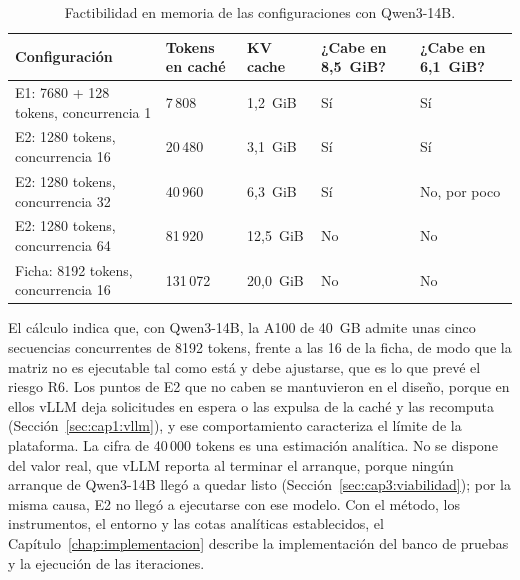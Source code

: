 \begin{table}[htbp]
  \centering
  \caption{Factibilidad en memoria de las configuraciones con Qwen3-14B.}
  \label{tab:cap2:factibilidad}
  \small
  \begin{tabular}{|p{}|p{}|p{}|p{}|p{}|}
    \hline
    \textbf{Configuración} & \textbf{Tokens en caché} & \textbf{KV cache} & \textbf{¿Cabe en 8,5~GiB?} & \textbf{¿Cabe en 6,1~GiB?} \\
    \hline
    E1: 7680 + 128 tokens, concurrencia 1 & 7\,808 & 1,2~GiB & Sí & Sí \\
    \hline
    E2: 1280 tokens, concurrencia 16 & 20\,480 & 3,1~GiB & Sí & Sí \\
    \hline
    E2: 1280 tokens, concurrencia 32 & 40\,960 & 6,3~GiB & Sí & No, por poco \\
    \hline
    E2: 1280 tokens, concurrencia 64 & 81\,920 & 12,5~GiB & No & No \\
    \hline
    Ficha: 8192 tokens, concurrencia 16 & 131\,072 & 20,0~GiB & No & No \\
    \hline
  \end{tabular}
\end{table}

El cálculo indica que, con Qwen3-14B, la A100 de 40~GB admite unas cinco secuencias concurrentes de 8192 tokens, frente a las 16 de la ficha, de modo que la matriz no es ejecutable tal como está y debe ajustarse, que es lo que prevé el riesgo R6. Los puntos de E2 que no caben se mantuvieron en el diseño, porque en ellos vLLM deja solicitudes en espera o las expulsa de la caché y las recomputa (Sección~\ref{sec:cap1:vllm}), y ese comportamiento caracteriza el límite de la plataforma. La cifra de 40\,000 tokens es una estimación analítica. No se dispone del valor real, que vLLM reporta al terminar el arranque, porque ningún arranque de Qwen3-14B llegó a quedar listo (Sección~\ref{sec:cap3:viabilidad}); por la misma causa, E2 no llegó a ejecutarse con ese modelo. Con el método, los instrumentos, el entorno y las cotas analíticas establecidos, el Capítulo~\ref{chap:implementacion} describe la implementación del banco de pruebas y la ejecución de las iteraciones.
